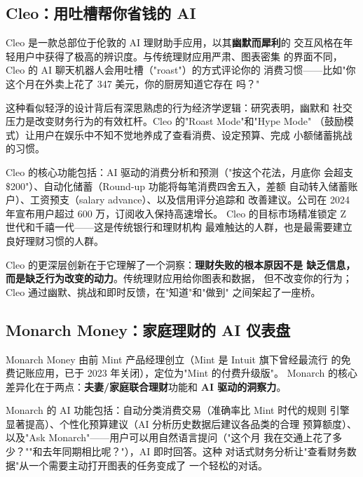 \subsection{Cleo：用吐槽帮你省钱的 AI}
\label{subsec:cleo}

Cleo 是一款总部位于伦敦的 AI 理财助手应用，以其\textbf{幽默而犀利}的
交互风格在年轻用户中获得了极高的辨识度。与传统理财应用严肃、图表密集
的界面不同，Cleo 的 AI 聊天机器人会用吐槽（"roast"）的方式评论你的
消费习惯——比如"你这个月在外卖上花了 347 美元，你的厨房知道它存在
吗？"

这种看似轻浮的设计背后有深思熟虑的行为经济学逻辑：研究表明，幽默和
社交压力是改变财务行为的有效杠杆。Cleo 的"Roast Mode"和"Hype Mode"
（鼓励模式）让用户在娱乐中不知不觉地养成了查看消费、设定预算、完成
小额储蓄挑战的习惯。

Cleo 的核心功能包括：AI 驱动的消费分析和预测（"按这个花法，月底你
会超支 \$200"）、自动化储蓄（Round-up 功能将每笔消费四舍五入，差额
自动转入储蓄账户）、工资预支（salary advance）、以及信用评分追踪和
改善建议。公司在 2024 年宣布用户超过 600 万，订阅收入保持高速增长。
Cleo 的目标市场精准锁定 Z 世代和千禧一代——这是传统银行和理财机构
最难触达的人群，也是最需要建立良好理财习惯的人群。

Cleo 的更深层创新在于它理解了一个洞察：\textbf{理财失败的根本原因不是
缺乏信息，而是缺乏行为改变的动力}。传统理财应用给你图表和数据，
但不改变你的行为；Cleo 通过幽默、挑战和即时反馈，在"知道"和"做到"
之间架起了一座桥。


\subsection{Monarch Money：家庭理财的 AI 仪表盘}
\label{subsec:monarch}

Monarch Money 由前 Mint 产品经理创立（Mint 是 Intuit 旗下曾经最流行
的免费记账应用，已于 2023 年关闭），定位为"Mint 的付费升级版"。
Monarch 的核心差异化在于两点：\textbf{夫妻/家庭联合理财}功能和
\textbf{AI 驱动的洞察力}。

Monarch 的 AI 功能包括：自动分类消费交易（准确率比 Mint 时代的规则
引擎显著提高）、个性化预算建议（AI 分析历史数据后建议各品类的合理
预算额度）、以及"Ask Monarch"——用户可以用自然语言提问（"这个月
我在交通上花了多少？""和去年同期相比呢？"），AI 即时回答。这种
对话式财务分析让"查看财务数据"从一个需要主动打开图表的任务变成了
一个轻松的对话。

